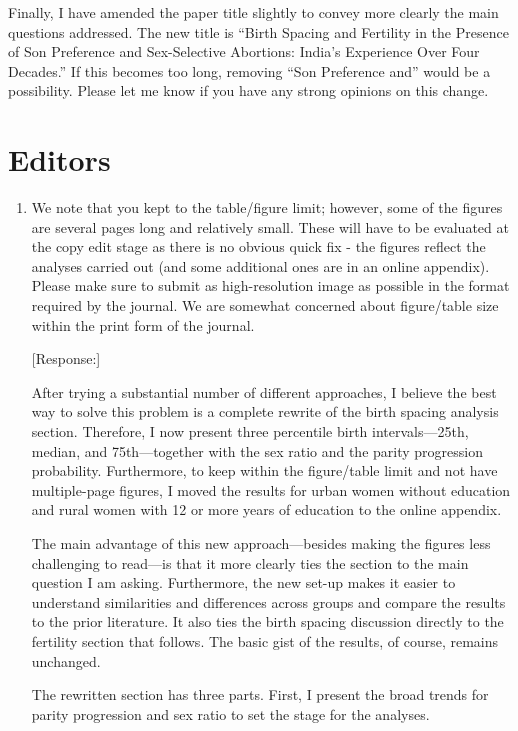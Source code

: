 \documentclass[letterpaper,12pt]{article}
\begin{document}
Finally, I have amended the paper title slightly to convey more clearly the main questions 
addressed.
The new title is ``Birth Spacing and Fertility in the Presence of Son Preference and 
Sex-Selective Abortions: India's Experience Over Four Decades.'' 
If this becomes too long, removing ``Son Preference and'' would be a possibility.
Please let me know if you have any strong opinions on this change.


\section*{Editors}

\begin{enumerate}

\item We note that you kept to the table/figure limit; however, some of
the figures are several pages long and relatively small. These will have
to be evaluated at the copy edit stage as there is no obvious quick fix
- the figures reflect the analyses carried out (and some additional ones
are in an online appendix). Please make sure to submit as
high-resolution image as possible in the format required by the journal.
We are somewhat concerned about figure/table size within the print form
of the journal.

[Response:]

After trying a substantial number of different approaches, I believe the best way to solve 
this problem is a complete rewrite of the birth spacing analysis section.
Therefore, I now present three percentile birth intervals---25th, median, and 75th---together
with the sex ratio and the parity progression probability.
Furthermore, to keep within the figure/table limit and not have multiple-page figures,
I moved the results for urban women without education and rural women with 12 or more 
years of education to the online appendix.

The main advantage of this new approach---besides making the figures less challenging to 
read---is that it more clearly ties the section to the main question I am asking.
Furthermore, the new set-up makes it easier to understand similarities and differences 
across groups and compare the results to the prior literature.
It also ties the birth spacing discussion directly to the fertility section that follows.
The basic gist of the results, of course, remains unchanged.

The rewritten section has three parts.
First, I present the broad trends for parity progression and sex ratio to set the
stage for the analyses.


\end{enumerate}
\end{document}
